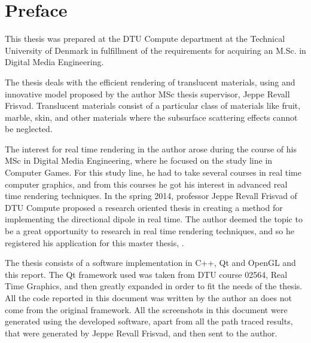 \chapter{Preface}

\vspace{1cm}
This thesis was prepared at the DTU Compute department at the Technical University of Denmark in fulfillment of the
requirements for acquiring an M.Sc. in Digital Media Engineering.

The thesis deals with the efficient rendering of translucent materials, using and innovative model proposed by the author MSc thesis supervisor, Jeppe Revall Frisvad. Translucent materials consist of a particular class of materials like fruit, marble, skin, and other materials where the subsurface scattering effects cannot be neglected. 

The interest for real time rendering in the author arose during the course of his MSc in Digital Media Engineering, where he focused on the study line in Computer Games. For this study line, he had to take several courses in real time computer graphics, and from this courses he got his interest in advanced real time rendering techniques. In the spring 2014, professor Jeppe Revall Frisvad of DTU Compute proposed a research oriented thesis in creating a method for implementing the directional dipole in real time. The author deemed the topic to be a great opportunity to research in real time rendering techniques, and so he registered his application for this master thesis, \emph{\thesistitle}.

The thesis consists of a software implementation in C++, Qt and OpenGL and this report. The Qt framework used was taken from DTU course 02564, Real Time Graphics, and then greatly expanded in order to fit the needs of the thesis. All the code reported in this document was written by the author an does not come from the original framework. All the screenshots in this document were generated using the developed software, apart from all the path traced results, that were generated by Jeppe Revall Frisvad, and then sent to the author.

